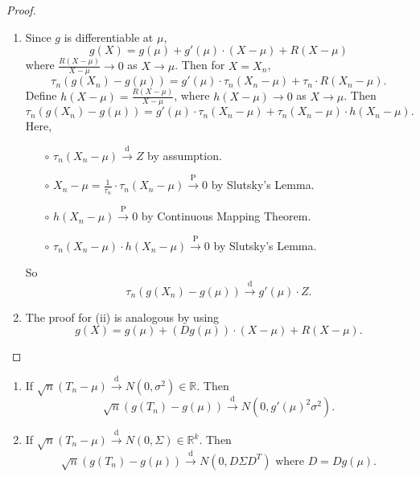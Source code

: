 \documentclass[a4paper]{article}
\begin{document}
\newpage
\begin{proof}
	\quad
	\begin{enumerate}
		\item Since $g$ is differentiable at $\mu$,
		\begin{equation*}
			g(X) = g(\mu) + g'(\mu)\cdot(X-\mu)+R(X-\mu)
		\end{equation*}
		where $\frac{R(X-\mu)}{X-\mu} \to 0$ as $X \to \mu$.
		Then for $X = X_n$,
		\begin{equation}
			\tau_n(g(X_n) - g(\mu)) = g'(\mu) \cdot \tau_n(X_n - \mu) + \tau_n \cdot R(X_n - \mu).
		\end{equation}
		Define $h(X-\mu) = \frac{R(X-\mu)}{X-\mu}$, where $h(X-\mu) \to 0$ as $X \to \mu$. Then
		\begin{equation}
			\tau_n(g(X_n) - g(\mu)) = g'(\mu) \cdot \tau_n(X_n - \mu) + \tau_n (X_n - \mu) \cdot h(X_n -\mu).
		\end{equation}
		Here,
		\begin{itemize}
			\item[$\circ$] $\tau_n(X_n - \mu) \stackrel{\text{d}}{\longrightarrow} Z$ by assumption.
			\item[$\circ$] $X_n - \mu = \frac{1}{\tau_n}\cdot \tau_n(X_n - \mu) \stackrel{\text{P}}{\longrightarrow} 0$ by Slutsky's Lemma.
			\item[$\circ$] $h(X_n - \mu) \stackrel{\text{P}}{\longrightarrow} 0$ by Continuous Mapping Theorem.
			\item[$\circ$] $\tau_n (X_n - \mu) \cdot h(X_n -\mu) \stackrel{\text{P}}{\longrightarrow} 0$ by Slutsky's Lemma.
		\end{itemize}
		So
		\begin{equation}
			\tau_n(g(X_n)-g(\mu)) \stackrel{\text{d}}{\longrightarrow} g'(\mu) \cdot Z.
		\end{equation}
		\item The proof for (ii) is analogous by using
		\begin{equation*}
			g(X) = g(\mu) + (Dg(\mu))\cdot(X-\mu)+R(X-\mu).
		\end{equation*}
	\end{enumerate}
\end{proof}

\begin{cor}
	\quad
	\begin{enumerate}
		\item If $\sqrt{n}(T_n - \mu) \stackrel{\text{d}}{\longrightarrow} N(0,\sigma^2) \in \mathbb{R}$. Then
		\begin{equation}
			\sqrt{n}(g(T_n) - g(\mu)) \stackrel{\text{d}}{\longrightarrow} N(0,g'(\mu)^2 \sigma^2).
		\end{equation}
		\item If $\sqrt{n}(T_n - \mu) \stackrel{\text{d}}{\longrightarrow} N(0,\Sigma) \in \mathbb{R}^k$. Then
		\begin{equation}
			\sqrt{n}(g(T_n) - g(\mu)) \stackrel{\text{d}}{\longrightarrow} N(0,D \Sigma D^T) \text{ where } D = Dg(\mu).
		\end{equation}
	\end{enumerate}
\end{cor}
\end{document}
